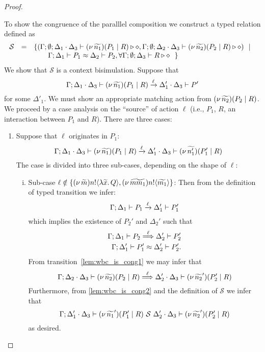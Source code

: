 \begin{proof}
\begin{enumerate}[I.]
	To show the congruence of the paralllel composition we construct a typed relation defined as 
	\[
	\begin{array}{rcl}
		\mathcal{S} &=&	\{
				(\Gamma; \emptyset; \Delta_1 \cdot \Delta_3 \vdash (\nu\, \widetilde{n_1})(P_1 \;|\; R) \triangleright \diamond,
				\Gamma; \emptyset; \Delta_2 \cdot \Delta_3 \vdash (\nu\, \widetilde{n_2})(P_2 \;|\; R)\triangleright \diamond)
				\ \ |\ \  \\
		& &		\qquad \Gamma; \Delta_1 \vdash P_1 \approx \Delta_2 \vdash P_2, \forall \Gamma; \emptyset; \Delta_3 \vdash R \triangleright \diamond~~\}\\
	\end{array}
	\]
	\noi We  show that $\mathcal{S}$ is a context bisimulation.
	Suppose that 
	$$
	\Gamma; \Delta_1 \cdot \Delta_3 \vdash (\nu\, \widetilde{n_1})(P_1 \;|\; R) \xrightarrow{\ell} \Delta_1' \cdot \Delta_3 \vdash P'
					$$
	for some $\Delta'_1$. We must show an appropriate matching action from $(\nu\, \widetilde{n_2})(P_2 \;|\; R)$.
	We proceed by a case analysis on the ``source'' of  action $\ell$ (i.e., $P_1$, $R$, an interaction between $P_1$ and $R$).
    There are three cases:
    
	\begin{enumerate}[1.]

		\item Suppose that $\ell$ originates in $P_1$:
				\[
					\Gamma; \Delta_1 \cdot \Delta_3 \vdash (\nu\, \widetilde{n_1})(P_1 \;|\; R) \xrightarrow{\ell} \Delta_1' \cdot \Delta_3 \vdash (\nu\, \widetilde{n_1'})(P_1' \;|\; R)
				\]
				\noi The case is divided into three sub-cases, depending on the shape of $\ell$:

				\begin{enumerate}[i.]
					\item Sub-case	$\ell \notin \{(\nu\, \widetilde{m}) n ! \langle \lambda \widetilde{x}.\,Q \rangle, (\nu\, \widetilde{mm_1}) n ! \langle \widetilde{m_1} \rangle\}$: Then from the definition of typed transition we infer:
							\[
								\Gamma; \Delta_1 \vdash P_1 \xrightarrow{\ell} \Delta_1' \vdash P_1'
							\]
							\noi which implies the existence of $P_2'$ and $\Delta_2'$ such that
							\begin{eqnarray}
								\Gamma; \Delta_1 \vdash P_2 \stackrel{\ell}{\Longrightarrow} \Delta_2' \vdash P_2'
								\label{lem:wbc_is_cong1}\\
								\Gamma; \Delta_1' \vdash P_1' \approx \Delta_2' \vdash P_2'.
								\label{lem:wbc_is_cong2}
							\end{eqnarray}
							\noi From transition~\eqref{lem:wbc_is_cong1} we may infer that 
							\[
								\Gamma; \Delta_2 \cdot \Delta_3 \vdash (\nu\, \widetilde{n_2})(P_2 \;|\; R) \stackrel{\ell}{\Longrightarrow} \Delta_2' \cdot \Delta_3 \vdash (\nu\, \widetilde{n_2}')(P_2' \;|\; R)
							\]
							\noi Furthermore, from \eqref{lem:wbc_is_cong2} and the definition of $\mathcal{S}$ we infer that
							\[
								\Gamma; \Delta_1' \cdot \Delta_3 \vdash (\nu\, \widetilde{n_1}')(P_1' \;|\; R) \ \mathcal{S}\  \Delta_2' \cdot \Delta_3 \vdash (\nu\, \widetilde{n_2}')(P_2' \;|\; R)
							\]
							as desired.
							

\end{enumerate}
\end{enumerate}
\end{enumerate}
\end{proof}

